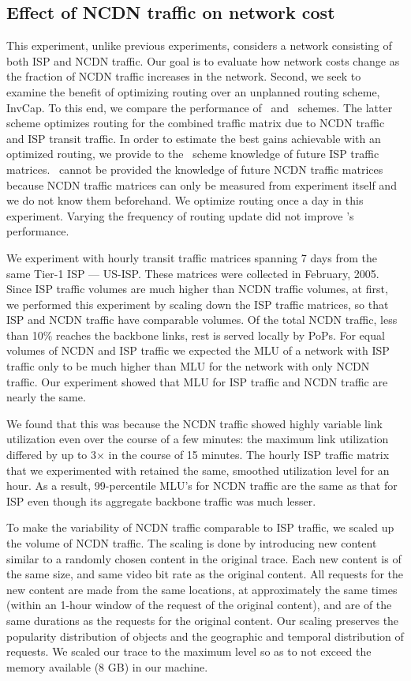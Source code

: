 \subsection{Effect of NCDN traffic on network cost}
This experiment, unlike previous experiments, considers a network consisting of both ISP and NCDN traffic. Our goal is to evaluate how network costs change as the fraction of NCDN traffic increases in the network. Second, we seek to examine the benefit of optimizing routing over an unplanned routing scheme, InvCap. To this end, we compare the performance of \invlru\ and \optlru\ schemes. The latter scheme optimizes routing for the combined traffic matrix due to NCDN traffic and ISP transit traffic. 
In order to estimate the best gains achievable with an optimized routing, we provide to the \optlru\ scheme knowledge of future ISP traffic matrices. \optlru\ cannot be provided the knowledge of future NCDN traffic matrices because NCDN traffic matrices can only be measured from experiment itself and we do not know them beforehand. We optimize routing once a day in this experiment. Varying the frequency of routing update did not improve \optlru's performance.



We experiment with  hourly transit traffic matrices spanning 7 days from the same Tier-1 ISP --- US-ISP. These matrices were collected in February, 2005.
 Since ISP traffic volumes are much higher than NCDN traffic volumes, at first, we performed this experiment by scaling down the ISP traffic matrices, so that ISP and NCDN traffic have comparable volumes. Of the total NCDN traffic, less than 10\%  reaches the backbone links, rest is served locally by PoPs. 
For equal volumes of NCDN and ISP traffic we expected the MLU of a network  with ISP traffic only to be much higher than MLU for the network with only NCDN traffic. 
Our experiment showed that MLU for ISP traffic and NCDN traffic are nearly the same.

We found that this was because the NCDN traffic showed highly variable link utilization even over the course of a few minutes: the maximum link utilization differed by up to 3$\times$  in the course of 15 minutes. The hourly ISP traffic matrix that we experimented with  retained the same, smoothed utilization level for an hour.  As a result, 99-percentile MLU's for NCDN traffic are the same as that for ISP even though its aggregate backbone traffic was much lesser.


To make the variability of NCDN traffic comparable to ISP traffic, we scaled up the volume of NCDN traffic. The scaling is done by introducing new content similar to a randomly chosen content in the original trace. 
Each new content is of the same size, and same video bit rate  as the original content. All requests for the new content are made from the same locations, at approximately the same times (within an 1-hour window of the request of the original content),  and are of the same durations as the requests for the original content. Our scaling preserves the popularity distribution of objects and the geographic and temporal distribution of requests. We scaled our trace to the maximum level so as to not exceed the memory available (8 GB) in our machine.


